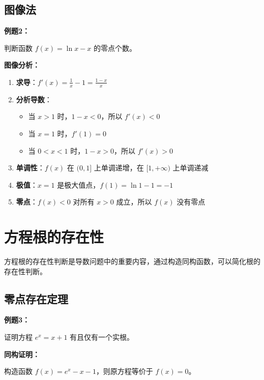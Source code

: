 \documentclass[a4paper,11pt]{ctexrep}
\newcommand{\exampleicon}{\ModeBadge[highlight]{例题}}
\newcommand{\analysisicon}{\ModeBadge[secondary]{分析}}
\theoremstyle{definition}
\begin{document}
\subsection{图像法}

\exampleicon \textbf{例题2：}

判断函数 $f(x) = \ln x - x$ 的零点个数。

\analysisicon \textbf{图像分析：}

\begin{enumerate}
    \item \textbf{求导}：$f'(x) = \frac{1}{x} - 1 = \frac{1-x}{x}$
    \item \textbf{分析导数}：
    \begin{itemize}
        \item 当 $x > 1$ 时，$1-x < 0$，所以 $f'(x) < 0$
        \item 当 $x = 1$ 时，$f'(1) = 0$
        \item 当 $0 < x < 1$ 时，$1-x > 0$，所以 $f'(x) > 0$
    \end{itemize}
    \item \textbf{单调性}：$f(x)$ 在 $(0, 1]$ 上单调递增，在 $[1, +\infty)$ 上单调递减
    \item \textbf{极值}：$x = 1$ 是极大值点，$f(1) = \ln 1 - 1 = -1$
    \item \textbf{零点}：$f(x) < 0$ 对所有 $x > 0$ 成立，所以 $f(x)$ 没有零点
\end{enumerate}

\section{方程根的存在性}

方程根的存在性判断是导数问题中的重要内容，通过构造同构函数，可以简化根的存在性判断。

\subsection{零点存在定理}

\exampleicon \textbf{例题3：}

证明方程 $e^x = x + 1$ 有且仅有一个实根。

\analysisicon \textbf{同构证明：}

构造函数 $f(x) = e^x - x - 1$，则原方程等价于 $f(x) = 0$。
\end{document}

